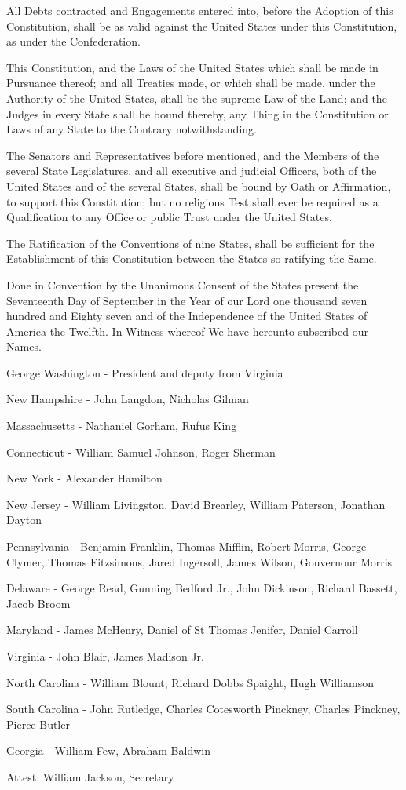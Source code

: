 \documentclass[12pt]{constitution}
\begin{document}

All Debts contracted and Engagements entered into, before the Adoption of this
Constitution, shall be as valid against the United States under this
Constitution, as under the Confederation.

This Constitution, and the Laws of the United States which shall be made in
Pursuance thereof; and all Treaties made, or which shall be made, under the
Authority of the United States, shall be the supreme Law of the Land; and the
Judges in every State shall be bound thereby, any Thing in the Constitution or
Laws of any State to the Contrary notwithstanding.

The Senators and Representatives before mentioned, and the Members of the
several State Legislatures, and all executive and judicial Officers, both of
the United States and of the several States, shall be bound by Oath or
Affirmation, to support this Constitution; but no religious Test shall ever be
required as a Qualification to any Office or public Trust under the United
States.



The Ratification of the Conventions of nine States, shall be sufficient for the
Establishment of this Constitution between the States so ratifying the Same.

Done in Convention by the Unanimous Consent of the States present the
Seventeenth Day of September in the Year of our Lord one thousand seven hundred
and Eighty seven and of the Independence of the United States of America the
Twelfth. In Witness whereof We have hereunto subscribed our Names.

George Washington - President and deputy from Virginia

New Hampshire - John Langdon, Nicholas Gilman

Massachusetts - Nathaniel Gorham, Rufus King

Connecticut - William Samuel Johnson, Roger Sherman

New York - Alexander Hamilton

New Jersey - William Livingston, David Brearley, William Paterson, Jonathan
Dayton

Pennsylvania - Benjamin Franklin, Thomas Mifflin, Robert Morris, George Clymer,
Thomas Fitzsimons, Jared Ingersoll, James Wilson, Gouvernour Morris

Delaware - George Read, Gunning Bedford Jr., John Dickinson, Richard Bassett,
Jacob Broom

Maryland - James McHenry, Daniel of St Thomas Jenifer, Daniel Carroll

Virginia - John Blair, James Madison Jr.

North Carolina - William Blount, Richard Dobbs Spaight, Hugh Williamson

South Carolina - John Rutledge, Charles Cotesworth Pinckney, Charles Pinckney,
Pierce Butler

Georgia - William Few, Abraham Baldwin

Attest: William Jackson, Secretary
\end{document}
